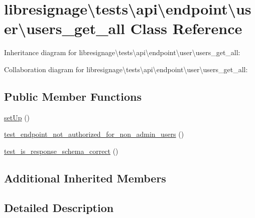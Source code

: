 \hypertarget{classlibresignage_1_1tests_1_1api_1_1endpoint_1_1user_1_1users__get__all}{}\section{libresignage\textbackslash{}tests\textbackslash{}api\textbackslash{}endpoint\textbackslash{}user\textbackslash{}users\+\_\+get\+\_\+all Class Reference}
\label{classlibresignage_1_1tests_1_1api_1_1endpoint_1_1user_1_1users__get__all}


Inheritance diagram for libresignage\textbackslash{}tests\textbackslash{}api\textbackslash{}endpoint\textbackslash{}user\textbackslash{}users\+\_\+get\+\_\+all\+:


Collaboration diagram for libresignage\textbackslash{}tests\textbackslash{}api\textbackslash{}endpoint\textbackslash{}user\textbackslash{}users\+\_\+get\+\_\+all\+:
\subsection*{Public Member Functions}
\begin{DoxyCompactItemize}
\item 
\hyperlink{classlibresignage_1_1tests_1_1api_1_1endpoint_1_1user_1_1users__get__all_a1d00e5becdd35301fd60cc93a24e83e5}{set\+Up} ()
\item 
\hyperlink{classlibresignage_1_1tests_1_1api_1_1endpoint_1_1user_1_1users__get__all_a77ae9ea97a4f20c5eee2bdf665175d5b}{test\+\_\+endpoint\+\_\+not\+\_\+authorized\+\_\+for\+\_\+non\+\_\+admin\+\_\+users} ()
\item 
\hyperlink{classlibresignage_1_1tests_1_1api_1_1endpoint_1_1user_1_1users__get__all_ac238429241430fc3c5b2524d2174fbb6}{test\+\_\+is\+\_\+response\+\_\+schema\+\_\+correct} ()
\end{DoxyCompactItemize}
\subsection*{Additional Inherited Members}


\subsection{Detailed Description}


